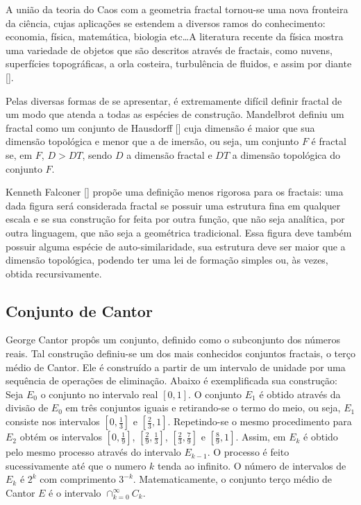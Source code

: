 \documentclass[brazil,ruledheader]{abnt}
\renewcommand{\cite}[1]{[\citeonline{#1}]}
\begin{document}
A união da teoria do Caos com a geometria  fractal tornou-se uma nova
fronteira da ciência, cujas aplicações se estendem a diversos ramos
do conhecimento: economia, física, matemática, biologia etc\dots A
literatura recente da física mostra uma variedade de objetos que são
descritos através de fractais, como nuvens, superfícies topográficas, a
orla costeira, turbulência de fluidos, e assim por diante \cite{Fa03}.

Pelas diversas formas de se apresentar, é extremamente difícil definir fractal
de um modo que atenda a todas as espécies de construção. Mandelbrot definiu
um fractal como um conjunto de Hausdorff \cite{Fa03} cuja dimensão é maior que
sua dimensão topológica e menor que a de imersão, ou seja, um conjunto $F$
é fractal se, em $F$, $D > DT$, sendo $D$ a dimensão fractal e $DT$ a dimensão
topológica do conjunto $F$.

Kenneth Falconer \cite{Fa03} propõe uma definição menos rigorosa para os
fractais: uma dada figura será considerada fractal se possuir uma estrutura fina
em qualquer escala e se sua construção for feita por outra função, que não
seja analítica,  por outra linguagem, que não seja a geométrica tradicional.
Essa figura deve também possuir alguma espécie de auto-similaridade,
sua estrutura deve ser maior que a dimensão topológica, podendo ter uma lei
de formação simples ou, às vezes, obtida recursivamente.

\subsection{Conjunto de Cantor}

George Cantor propôs um conjunto, definido como o subconjunto dos
números reais. Tal construção definiu-se um dos mais conhecidos
conjuntos fractais, o terço médio de Cantor. Ele é construído a partir de um
intervalo de unidade por uma sequência de operações de eliminação. Abaixo é
exemplificada
sua construção: Seja $E_0$ o conjunto no intervalo real $[0,1]$. O conjunto
$E_1$ é obtido através da divisão de $E_0$ em três conjuntos iguais e
retirando-se o termo do meio, ou seja, $E_1$ consiste nos intervalos
$[0,\frac{1}{3}]$ e $[\frac{2}{3},1]$. Repetindo-se o mesmo procedimento para
$E_2 $ obtém os intervalos $[0,\frac{1}{9}]$, $[\frac{2}{9},\frac{1}{3}]$,
$[\frac{2}{3},\frac{7}{9}]$ e $[\frac{8}{9},1]$. Assim, em $E_k$ é obtido pelo
mesmo processo através do intervalo $E_{k-1}$. O processo é feito
sucessivamente até que o numero $k$ tenda ao infinito. O número de intervalos de
$E_k$ é $2^k$ com comprimento $3^{-k}$. Matematicamente, o conjunto terço médio
de Cantor $E$ é o intervalo $\cap_{k=0}^\infty C_k$.
\end{document}
